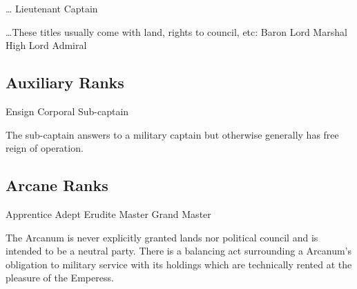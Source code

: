 \ldots \textrightarrow
Lieutenant \textrightarrow
Captain

\ldots \textrightarrow These titles usually come with land, rights to council, etc:
Baron \textrightarrow
Lord Marshal \textrightarrow
High Lord Admiral

\subsection{Auxiliary Ranks}
Ensign \textrightarrow
Corporal \textrightarrow
Sub-captain

The sub-captain answers to a military captain but otherwise generally has free reign of operation.

\subsection{Arcane Ranks}
Apprentice \textrightarrow
Adept \textrightarrow
Erudite \textrightarrow
Master \textrightarrow
Grand Master

The Arcanum is never explicitly granted lands nor political council and is intended to be a
  neutral party.
There is a balancing act surrounding a Arcanum's obligation to military service with its holdings
  which are technically rented at the pleasure of the Emperess.
